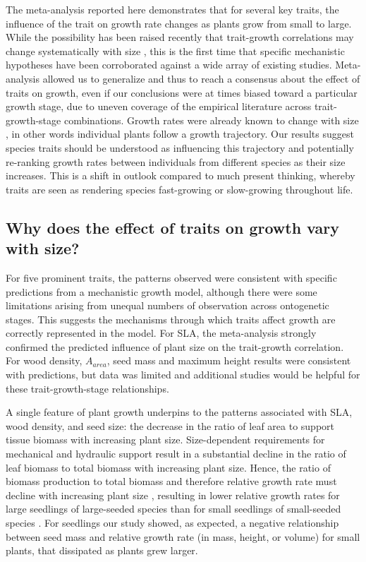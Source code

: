 \documentclass[a4paper,11pt]{article}
\begin{document}
The meta-analysis reported here demonstrates that for several key traits, the influence of the trait on growth rate changes as plants grow from small to large. While the possibility has been raised recently that trait-growth correlations may change systematically with size \citep{Falster:2011ii, Ruger:2012jv, Iida:2014ep, Iida:2014hq}, this is the first time that specific mechanistic hypotheses have been corroborated against a wide array of existing studies. Meta-analysis allowed us to generalize and thus to reach a consensus about the effect of traits on growth, even if our conclusions were at times biased toward a particular growth stage, due to uneven coverage of the empirical literature across trait-growth-stage combinations. Growth rates were already known to change with size \citep{Condit:1993hd, Clark:1999ed, Herault:2011dd}, in other words individual plants follow a growth trajectory. Our results suggest species traits should be understood as influencing this trajectory and potentially re-ranking growth rates between individuals from different species as their size increases. This is a shift in outlook compared to much present thinking, whereby traits are seen as rendering species fast-growing or slow-growing throughout life.

\subsection*{Why does the effect of traits on growth vary with size?}

For five prominent traits, the patterns observed were consistent with specific predictions from a mechanistic growth model, although there were some limitations arising from unequal numbers of observation across ontogenetic stages. This suggests the mechanisms through which traits affect growth are correctly represented in the model. For SLA, the meta-analysis strongly confirmed the predicted influence of plant size on the trait-growth correlation. For wood density, $A_{area}$, seed mass and maximum height results were consistent with predictions, but data was limited and additional studies would be helpful for these trait-growth-stage relationships.

A single feature of plant growth underpins to the patterns associated with SLA, wood density, and seed size: the decrease in the ratio of leaf area to support tissue biomass with increasing plant size. Size-dependent requirements for mechanical and hydraulic support result in a substantial decline in the ratio of leaf biomass to total biomass with increasing plant size. Hence, the ratio of biomass production to total biomass and therefore relative growth rate must decline with increasing plant size \citep{Givnish:1995ta, Enquist:2007ek}, resulting in lower relative growth rates for large seedlings of large-seeded species than for small seedlings of small-seeded species \citep[reviewed by][]{Turnbull:2012ew}. For seedlings our study showed, as expected, a negative relationship between seed mass and relative growth rate (in mass, height, or volume) for small plants, that dissipated as plants grew larger.
\end{document}
